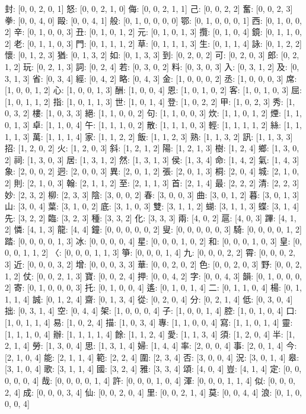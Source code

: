 \documentclass[a4paper,10pt,ngerman]{scrartcl}
\begin{document}
封: [0, 0, 2, 0, 1]
怒: [0, 0, 2, 1, 0]
侮: [0, 0, 2, 1, 1]
己: [0, 0, 2, 2]
奮: [0, 0, 2, 3]
拳: [0, 0, 4, 0]
毆: [0, 0, 4, 1]
般: [0, 1, 0, 0, 0, 0]
鄂: [0, 1, 0, 0, 0, 1]
西: [0, 1, 0, 0, 2]
辛: [0, 1, 0, 0, 3]
丑: [0, 1, 0, 1, 2]
元: [0, 1, 0, 1, 3]
攬: [0, 1, 0, 4]
鏡: [0, 1, 1, 0, 2]
老: [0, 1, 1, 0, 3]
門: [0, 1, 1, 1, 2]
草: [0, 1, 1, 1, 3]
生: [0, 1, 1, 4]
詠: [0, 1, 2, 2]
懷: [0, 1, 2, 3]
猶: [0, 1, 3, 2]
如: [0, 1, 3, 3]
到: [0, 2, 0, 2]
可: [0, 2, 0, 3]
郎: [0, 2, 1, 2]
玩: [0, 2, 1, 3]
詞: [0, 2, 4]
若: [0, 3, 0, 2]
料: [0, 3, 0, 3]
入: [0, 3, 1, 2]
及: [0, 3, 1, 3]
省: [0, 3, 4]
經: [0, 4, 2]
略: [0, 4, 3]
金: [1, 0, 0, 0, 2]
丞: [1, 0, 0, 0, 3]
席: [1, 0, 0, 1, 2]
心: [1, 0, 0, 1, 3]
酬: [1, 0, 0, 4]
恩: [1, 0, 1, 0, 2]
客: [1, 0, 1, 0, 3]
屈: [1, 0, 1, 1, 2]
指: [1, 0, 1, 1, 3]
世: [1, 0, 1, 4]
登: [1, 0, 2, 2]
甲: [1, 0, 2, 3]
秀: [1, 0, 3, 2]
樓: [1, 0, 3, 3]
絕: [1, 1, 0, 0, 2]
句: [1, 1, 0, 0, 3]
炊: [1, 1, 0, 1, 2]
煙: [1, 1, 0, 1, 3]
卓: [1, 1, 0, 4]
午: [1, 1, 1, 0, 2]
散: [1, 1, 1, 0, 3]
輕: [1, 1, 1, 1, 2]
絲: [1, 1, 1, 1, 3]
萬: [1, 1, 1, 4]
家: [1, 1, 2, 2]
飯: [1, 1, 2, 3]
熟: [1, 1, 3, 2]
訊: [1, 1, 3, 3]
招: [1, 2, 0, 2]
火: [1, 2, 0, 3]
斜: [1, 2, 1, 2]
陽: [1, 2, 1, 3]
樹: [1, 2, 4]
鄉: [1, 3, 0, 2]
祠: [1, 3, 0, 3]
居: [1, 3, 1, 2]
然: [1, 3, 1, 3]
侯: [1, 3, 4]
命: [1, 4, 2]
氣: [1, 4, 3]
象: [2, 0, 0, 2]
迥: [2, 0, 0, 3]
異: [2, 0, 1, 2]
張: [2, 0, 1, 3]
桐: [2, 0, 4]
城: [2, 1, 0, 2]
則: [2, 1, 0, 3]
翰: [2, 1, 1, 2]
至: [2, 1, 1, 3]
首: [2, 1, 4]
最: [2, 2, 2]
清: [2, 2, 3]
妙: [2, 3, 2]
柳: [2, 3, 3]
陰: [3, 0, 0, 2]
春: [3, 0, 0, 3]
曲: [3, 0, 1, 2]
暮: [3, 0, 1, 3]
山: [3, 0, 4]
葉: [3, 1, 0, 2]
底: [3, 1, 0, 3]
雙: [3, 1, 1, 2]
蝴: [3, 1, 1, 3]
蝶: [3, 1, 4]
先: [3, 2, 2]
臨: [3, 2, 3]
種: [3, 3, 2]
化: [3, 3, 3]
兩: [4, 0, 2]
扈: [4, 0, 3]
蹕: [4, 1, 2]
憐: [4, 1, 3]
龍: [4, 4]
鐘: [0, 0, 0, 0, 0, 2]
叟: [0, 0, 0, 0, 0, 3]
騎: [0, 0, 0, 0, 1, 2]
踏: [0, 0, 0, 0, 1, 3]
冰: [0, 0, 0, 0, 4]
星: [0, 0, 0, 1, 0, 2]
和: [0, 0, 0, 1, 0, 3]
皇: [0, 0, 0, 1, 1, 2]
〈: [0, 0, 0, 1, 1, 3]
箏: [0, 0, 0, 1, 4]
九: [0, 0, 0, 2, 2]
霄: [0, 0, 0, 2, 3]
近: [0, 0, 0, 3, 2]
增: [0, 0, 0, 3, 3]
華: [0, 0, 2, 0, 2]
色: [0, 0, 2, 0, 3]
野: [0, 0, 2, 1, 2]
仗: [0, 0, 2, 1, 3]
寶: [0, 0, 2, 4]
押: [0, 0, 4, 2]
字: [0, 0, 4, 3]
韻: [0, 1, 0, 0, 0, 2]
寄: [0, 1, 0, 0, 0, 3]
托: [0, 1, 0, 0, 4]
遙: [0, 1, 0, 1, 4]
二: [0, 1, 1, 0, 4]
楊: [0, 1, 1, 1, 4]
誠: [0, 1, 2, 4]
齋: [0, 1, 3, 4]
從: [0, 2, 0, 4]
分: [0, 2, 1, 4]
低: [0, 3, 0, 4]
拙: [0, 3, 1, 4]
空: [0, 4, 4]
架: [1, 0, 0, 0, 4]
子: [1, 0, 0, 1, 4]
腔: [1, 0, 1, 0, 4]
口: [1, 0, 1, 1, 4]
易: [1, 0, 2, 4]
描: [1, 0, 3, 4]
專: [1, 1, 0, 0, 4]
寫: [1, 1, 0, 1, 4]
靈: [1, 1, 1, 0, 4]
辦: [1, 1, 1, 1, 4]
餘: [1, 1, 2, 4]
愛: [1, 1, 3, 4]
須: [1, 2, 0, 4]
半: [1, 2, 1, 4]
勞: [1, 3, 0, 4]
思: [1, 3, 1, 4]
婦: [1, 4, 4]
率: [2, 0, 0, 4]
事: [2, 0, 1, 4]
今: [2, 1, 0, 4]
能: [2, 1, 1, 4]
範: [2, 2, 4]
圍: [2, 3, 4]
否: [3, 0, 0, 4]
況: [3, 0, 1, 4]
皋: [3, 1, 0, 4]
歌: [3, 1, 1, 4]
國: [3, 2, 4]
雅: [3, 3, 4]
頌: [4, 0, 4]
豈: [4, 1, 4]
定: [0, 0, 0, 0, 0, 4]
哉: [0, 0, 0, 0, 1, 4]
許: [0, 0, 0, 1, 0, 4]
渾: [0, 0, 0, 1, 1, 4]
似: [0, 0, 0, 2, 4]
成: [0, 0, 0, 3, 4]
仙: [0, 0, 2, 0, 4]
里: [0, 0, 2, 1, 4]
莫: [0, 0, 4, 4]
浪: [0, 1, 0, 0, 0, 4]
\end{document}
